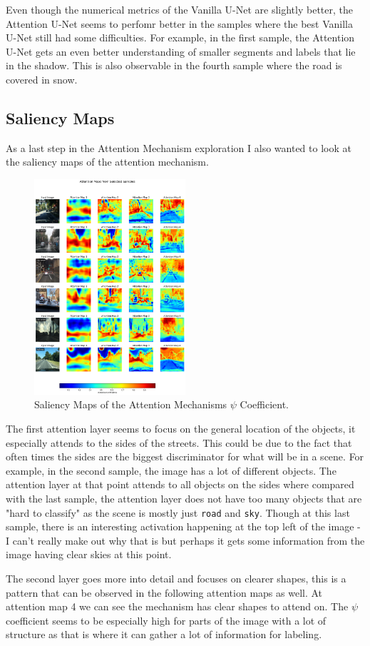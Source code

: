 Even though the numerical metrics of the Vanilla U-Net are slightly better, the Attention U-Net seems to perfomr better in the samples where the best Vanilla U-Net still had some difficulties. For example, in the first sample, the Attention U-Net gets an even better understanding of smaller segments and labels that lie in the shadow. This is also observable in the fourth sample where the road is covered in snow.

\clearpage
\subsection{Saliency Maps}
As a last step in the Attention Mechanism exploration I also wanted to look at the saliency maps of the attention mechanism.

\begin{figure}[H] 
    \centering 
    \includegraphics[width=0.5\textwidth]{figures/saliency_maps.png} 
    \caption{Saliency Maps of the Attention Mechanisms $\psi$ Coefficient.}
    \label{fig:saliency_maps} 
\end{figure}

The first attention layer seems to focus on the general location of the objects, it especially attends to the sides of the streets. This could be due to the fact that often times the sides are the biggest discriminator for what will be in a scene. For example, in the second sample, the image has a lot of different objects. The attention layer at that point attends to all objects on the sides where compared with the last sample, the attention layer does not have too many objects that are "hard to classify" as the scene is mostly just \texttt{road} and \texttt{sky}. Though at this last sample, there is an interesting activation happening at the top left of the image - I can't really make out why that is but perhaps it gets some information from the image having clear skies at this point.

The second layer goes more into detail and focuses on clearer shapes, this is a pattern that can be observed in the following attention maps as well. At attention map 4 we can see the mechanism has clear shapes to attend on. The $\psi$ coefficient seems to be especially high for parts of the image with a lot of structure as that is where it can gather a lot of information for labeling.

